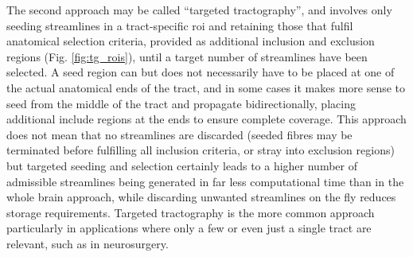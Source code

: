 \documentclass[12pt,phd,a4paper,twoside]{ucl_thesis}
\begin{document}
The second approach may be called ``targeted tractography'', and involves only seeding streamlines in a tract-specific \gls{roi} and retaining those that fulfil anatomical selection criteria, provided as additional inclusion and exclusion regions (Fig. \ref{fig:tg_rois}), until a target number of streamlines have been selected.
A seed region can but does not necessarily have to be placed at one of the actual anatomical ends of the tract, and in some cases it makes more sense to seed from the middle of the tract and propagate bidirectionally, placing additional include regions at the ends to ensure complete coverage.
This approach does not mean that no streamlines are discarded (seeded fibres may be terminated before fulfilling all inclusion criteria, or stray into exclusion regions) but targeted seeding and selection certainly leads to a higher number of admissible streamlines being generated in far less computational time than in the whole brain approach, while discarding unwanted streamlines on the fly reduces storage requirements.
Targeted tractography is the more common approach particularly in applications where only a few or even just a single tract are relevant, such as in neurosurgery\autocite{Yang2021}.
\end{document}
